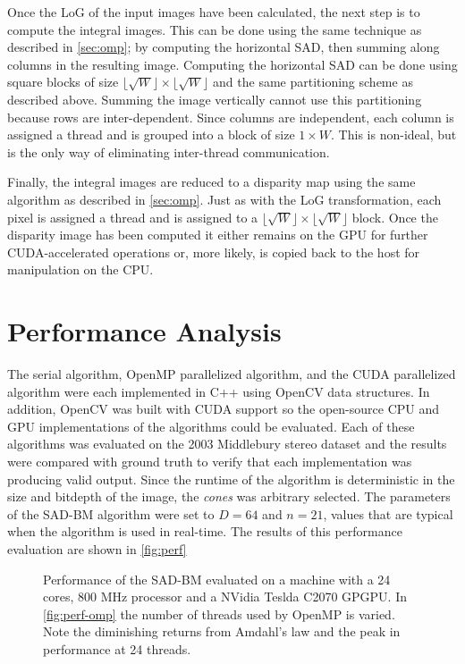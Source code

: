 \documentclass{article}
\let\orgautoref\autoref
\providecommand{\Autoref}
        {\def\equationautorefname{Equation}%
         \def\figureautorefname{Figure}%
         \def\subfigureautorefname{Figure}%
         \def\Itemautorefname{Item}%
         \def\tableautorefname{Table}%
         \def\sectionautorefname{Section}%
         \def\subsectionautorefname{Section}%
         \def\subsubsectionautorefname{Section}%
         \def\chapterautorefname{Section}%
         \def\partautorefname{Part}%
         \orgautoref}
\newcommand{\floor}[1]{\lfloor #1 \rfloor}
\begin{document}
Once the LoG of the input images have been calculated, the next step is to
compute the integral images. This can be done using the same technique as
described in \Autoref{sec:omp}; by computing the horizontal SAD, then summing
along columns in the resulting image. Computing the horizontal SAD can be done
using square blocks of size $\floor{\sqrt{W}} \times \floor{\sqrt{W}}$ and the
same partitioning scheme as described above. Summing the image vertically
cannot use this partitioning because rows are inter-dependent. Since columns
are independent, each column is assigned a thread and is grouped into a block
of size $1 \times W$. This is non-ideal, but is the only way of eliminating
inter-thread communication.

Finally, the integral images are reduced to a disparity map using the same
algorithm as described in \Autoref{sec:omp}. Just as with the LoG
transformation, each pixel is assigned a thread and is assigned to a
$\floor{\sqrt{W}} \times \floor{\sqrt{W}}$ block. Once the disparity image has
been computed it either remains on the GPU for further CUDA-accelerated
operations or, more likely, is copied back to the host for manipulation on the
CPU.

\section{Performance Analysis}
\label{sec:perf}
The serial algorithm, OpenMP parallelized algorithm, and the CUDA parallelized
algorithm were each implemented in C++ using OpenCV data structures. In
addition, OpenCV was built with CUDA support so the open-source CPU and GPU
implementations of the algorithms could be evaluated. Each of these algorithms
was evaluated on the 2003 Middlebury stereo dataset and the results were
compared with ground truth to verify that each implementation was producing
valid output. Since the runtime of the algorithm is deterministic in the size
and bitdepth of the image, the \textit{cones} was arbitrary selected. The
parameters of the SAD-BM algorithm were set to $D = 64$ and $n = 21$, values
that are typical when the algorithm is used in real-time. The results of this
performance evaluation are shown in \Autoref{fig:perf}

\begin{figure}
    \caption{
        Performance of the SAD-BM evaluated on a machine with a 24 cores, 800
        MHz processor and a NVidia Teslda C2070 GPGPU. In \ref{fig:perf-omp}
        the number of threads used by OpenMP is varied. Note the diminishing
        returns from Amdahl's law and the peak in performance at 24 threads.
    }
    \label{fig:perf}
\end{figure}
\end{document}
